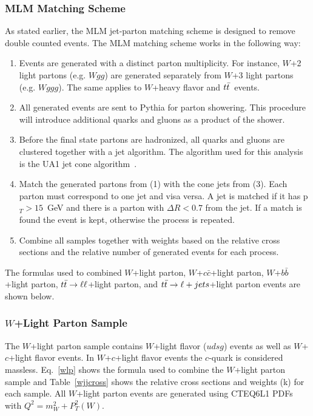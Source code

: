 \subsubsection{MLM Matching Scheme}

As stated earlier, the MLM jet-parton matching scheme is designed to remove double counted events. The MLM matching scheme works in the following way:

\begin{enumerate}
\item Events are generated with a distinct parton multiplicity. For instance, $W$+2 light partons (e.g. $Wgg$) are generated separately from $W$+3 light partons (e.g. $Wggg$). The same applies to $W$+heavy flavor and $\mbox{$t\bar{t}$}$~events.
\item All generated events are sent to Pythia for parton showering. This procedure will introduce additional quarks and gluons as a product of the shower.
\item Before the final state partons are hadronized, all quarks and gluons are clustered together with a jet algorithm. The algorithm used for this analysis is the UA1 jet cone algorithm~\cite{PhysRevLett.54.1983}.
\item Match the generated partons from (1) with the cone jets from (3). Each parton must correspond to one jet and visa versa. A jet is matched if it has p$_{T}>15$~GeV and there is a parton with $\Delta R<0.7$ from the jet. If a match is found the event is kept, otherwise the process is repeated.
\item Combine all samples together with weights based on the relative cross sections and the relative number of generated events for each process. 
\end{enumerate}

The formulas used to combined $W$+light parton, $W$+$c\bar{c}$+light parton, $W$+$b\bar{b}$+light parton, $\mbox{$t\bar{t}$} \rightarrow \ell \ell$+light parton, and $\mbox{$t\bar{t}$} \rightarrow \ell + jets$+light parton events are shown below.

\subsubsection{$W$+Light Parton Sample}

The $W$+light parton sample contains $W$+light flavor ($udsg$) events as well as $W$+$c$+light flavor events. In $W$+$c$+light flavor events the $c$-quark is considered massless. Eq.~\ref{wlp} shows the formula used to combine the $W$+light parton sample and Table~\ref{wjjcross} shows the relative cross sections and weights (k) for each sample. All $W$+light parton events are generated using CTEQ6L1 PDFs with $Q^{2}=m_{W}^{2} + P^{2}_{T}(W)$.

